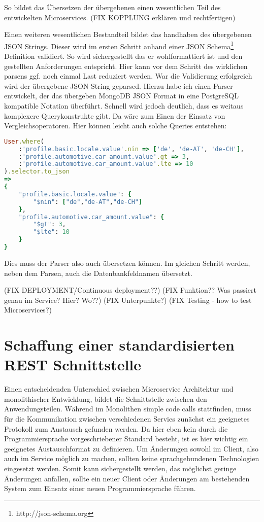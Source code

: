 \noindent So bildet das Übersetzen der übergebenen einen wesentlichen Teil des entwickelten Microservices. (FIX KOPPLUNG erklären und rechtfertigen)

Einen weiteren wesentlichen Bestandteil bildet das handhaben des übergebenen JSON Strings. Dieser wird im ersten Schritt anhand einer JSON Schema\footnote{http://json-schema.org} Definition validiert. So wird sichergestellt das er wohlformattiert ist und den gestellten Anforderungen entspricht. Hier kann vor dem Schritt des wirklichen parsens ggf. noch einmal Last reduziert werden. War die Validierung erfolgreich wird der übergebene JSON String geparsed. Hierzu habe ich einen Parser entwickelt, der das übergeben MongoDB JSON Format in eine PostgreSQL kompatible Notation überführt. Schnell wird jedoch deutlich, dass es weitaus komplexere Querykonstrukte gibt. Da wäre zum Einen der Einsatz von Vergleichsoperatoren. Hier können leicht auch solche Queries entstehen:

\begin{lstlisting}[language=Ruby]
User.where(
    :'profile.basic.locale.value'.nin => ['de', 'de-AT', 'de-CH'],
    :'profile.automotive.car_amount.value'.gt => 3,
    :'profile.automotive.car_amount.value'.lte => 10
).selector.to_json
=> 
{
    "profile.basic.locale.value": {
        "$nin": ["de","de-AT","de-CH"]
    },
    "profile.automotive.car_amount.value": {
        "$gt": 3,
        "$lte": 10
    }
}
\end{lstlisting}

\noindent Dies muss der Parser also auch übersetzen können. Im gleichen Schritt werden, neben dem Parsen, auch die Datenbankfeldnamen übersetzt.

(FIX DEPLOYMENT/Continuous deployment??)
(FIX Funktion?? Was passiert genau im Service? Hier? Wo??)
(FIX Unterpunkte?)
(FIX Testing - how to test Microservices?)

\section{Schaffung einer standardisierten REST Schnittstelle}
Einen entscheidenden Unterschied zwischen Microservice Architektur und monolithischer Entwicklung, bildet die Schnittstelle zwischen den Anwendungsteilen. Während im Monolithen simple code calls stattfinden, muss für die Kommunikation zwischen verschiedenen Servies zunächst ein geeignetes Protokoll zum Austausch gefunden werden.
Da hier eben kein durch die Programmiersprache vorgeschriebener Standard besteht, ist es hier wichtig ein geeignetes Austauschformat zu definieren.
Um Änderungen sowohl im Client, also auch im Service möglich zu machen, sollten keine sprachgebundenen Technologien eingesetzt werden. Somit kann sichergestellt werden, das möglichst geringe Änderungen anfallen, sollte ein neuer Client oder Änderungen am bestehenden System zum Einsatz einer neuen Programmiersprache führen.

